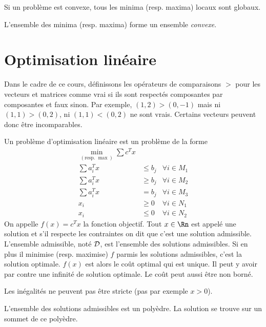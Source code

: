 \begin{myprop}
  \label{prop:loc2glob}
  Si un problème est convexe,
  tous les minima (resp. maxima) locaux sont globaux.
\end{myprop}
\begin{myprop}
  L'ensemble des minima (resp. maxima) forme un ensemble \emph{convexe}.
\end{myprop}

\part{Optimisation linéaire}

\begin{mydef}
  Dans le cadre de ce cours, définissons les opérateurs de comparaisons $>$
  pour les vecteurs et matrices comme vrai si ils sont respectés composantes
  par composantes et faux sinon.
  Par exemple, $(1, 2) > (0, -1)$ mais ni $(1, 1) > (0, 2)$,
  ni $(1, 1) < (0, 2)$ ne sont vrais.
  Certains vecteurs peuvent donc être incomparables.
\end{mydef}

\begin{mydef}
  Un problème d'optimisation linéaire est un problème de la forme
  \begin{align*}
    \min_{(\text{resp. }\max)} \sum c^T x\\
    \sum a_i^T x & \leq b_j & \forall i \in M_1\\
    \sum a_i^T x & \geq b_j & \forall i \in M_2\\
    \sum a_i^T x & = b_j & \forall i \in M_3\\
    x_i & \geq 0 & \forall i \in N_1\\
    x_i & \leq 0 & \forall i \in N_2
  \end{align*}
  On appelle $f(x) = c^Tx$ la fonction objectif.
  Tout $x \in \Rn$ est appelé une solution et s'il respecte les contraintes
  on dit que c'est une solution admissible.
  L'ensemble admissible, noté $\mathcal{D}$, est l'ensemble des solutions
  admissibles.
  Si en plus il minimise (resp. maximise) $f$ parmis les solutions admissibles,
  c'est la solution optimale.
  $f(x)$ est alors le coût optimal qui est unique.
  Il peut y avoir par contre une infinité de solution optimale.
  Le coût peut aussi être non borné.
\end{mydef}

\begin{myrem}
  Les inégalités ne peuvent pas être stricte (pas par exemple $x > 0$).
\end{myrem}
\begin{myrem}
  L'ensemble des solutions admissibles est un polyèdre.
  La solution se trouve sur un sommet de ce polyèdre.
\end{myrem}

